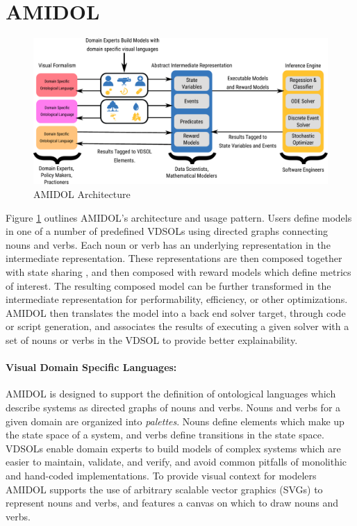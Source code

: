 \documentclass[11pt]{article}
\newcommand{\amidol}{\textsc{AMIDOL}}
\begin{document}
\section{AMIDOL}

\begin{figure}
  \includegraphics[width=\textwidth]{figs/system-architecture-quad.pdf}
  \caption{\amidol{} Architecture}
  \label{Fig:Architecture}
\end{figure}

Figure \ref{Fig:Architecture} outlines \amidol{}'s architecture and usage pattern. Users define models in one of a number of predefined VDSOLs using directed graphs connecting nouns and verbs.  Each noun or verb has an underlying representation in the intermediate representation.  These representations are then composed together with state sharing \cite{sanders1991reduced}, and then composed with reward models which define metrics of interest.  The resulting composed model can be further transformed in the intermediate representation for performability, efficiency, or other optimizations. \amidol{} then translates the model into a back end solver target, through code or script generation, and associates the results of executing a given solver with a set of nouns or verbs in the VDSOL to provide better explainability.

\paragraph{Visual Domain Specific Languages:}

\amidol{} is designed to support the definition of ontological languages which describe systems as directed graphs of nouns and verbs.  Nouns and verbs for a given domain are organized into \emph{palettes}. Nouns define elements which make up the state space of a system, and verbs define transitions in the state space.  VDSOLs enable domain experts to build models of complex systems which are easier to maintain, validate, and verify, and avoid common pitfalls of monolithic and hand-coded implementations.  To provide visual context for modelers \amidol{} supports the use of arbitrary scalable vector graphics (SVGs) to represent nouns and verbs, and features a canvas on which to draw nouns and verbs.
\end{document}

